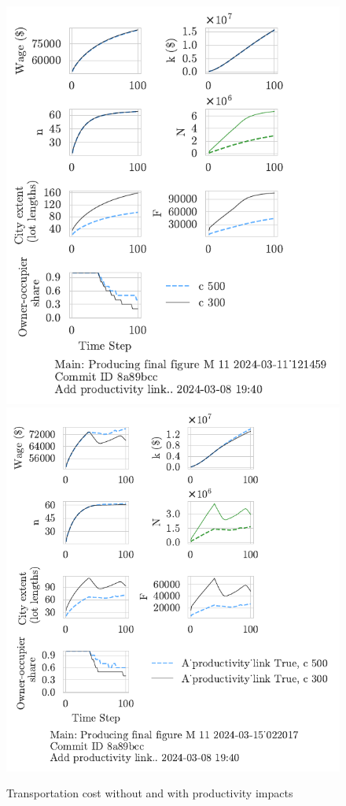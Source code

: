 \begin{figure}[h!tb] 
    \centering
    \includegraphics[scale=.75, trim={0 1.4cm 1.5cm 0},clip]{fig/c-Main-121459.pdf} 
    \includegraphics[scale=.75, trim={0 1.4cm 2.3cm 0},clip]{fig/With-productivity_link-c-15_022017.pdf} 
    \caption{Transportation cost without and with productivity impacts}
    \label{fig:Productivity_link_W-WO-transportation-cost}
\end{figure}
